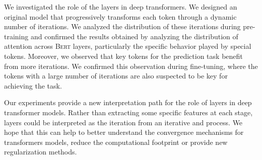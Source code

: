 We investigated the role of the layers in deep transformers. We designed an original model that progressively transforms each token through a dynamic number of iterations. We analyzed the distribution of these iterations during pre-training and confirmed the results obtained by analyzing the distribution of attention across \textsc{Bert}  layers, particularly the specific behavior played by special tokens. Moreover, we observed that key tokens for the prediction task benefit from more iterations. We confirmed this observation during fine-tuning, where the tokens with a large number of iterations are also suspected to be key for achieving the task.

Our experiments provide a new interpretation path for the role of layers in deep transformer models. Rather than extracting some specific features at each stage, layers could be interpreted as the iteration from an iterative and  process. We hope that this can help to better understand the convergence mechanisms for transformers models, reduce the computational footprint or provide new regularization methods.
